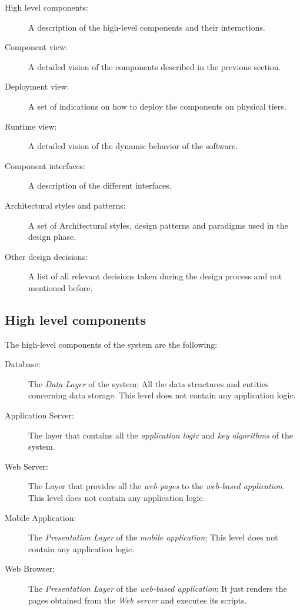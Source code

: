 \documentclass{article}
\begin{document}
	\bigskip
	\begin{description}
	\item [High level components:] A description of the high-level components and their interactions.
	\item [Component view:] A detailed vision of the components described in the previous section.
	\item [Deployment view:] A set of indications on how to deploy the components on physical tiers.
	\item [Runtime view:] A detailed vision of the dynamic behavior of the software.
	\item [Component interfaces:] A description of the different interfaces.
	\item [Architectural styles and patterns:] A set of Architectural styles, design patterns and paradigms used in the design phase.
	\item [Other design decisions:] A list of all relevant decisions taken during the design process and not mentioned before.
	\end{description}


	\subsection{High level components}

	The high-level components of the system are the following:

	\begin{description}
	\item [Database:] The \textit{Data Layer} of the system; All the data structures and entities concerning data storage. This level does not contain any application logic.
	\item [Application Server:] The layer that contains all the \textit{application logic} and \textit{key algorithms} of the system.
	\item [Web Server:] The Layer that provides all the \textit{web pages} to the \textit{web-based application}. This level does not contain any application logic.
	\item [Mobile Application:] The \textit{Presentation Layer} of the \textit{mobile application}; This level does not contain any application logic.
	\item [Web Browser:] The \textit{Presentation Layer} of the \textit{web-based application}; It just renders the pages obtained from the \textit{Web server} and executes its scripts.
	\end{description}
\end{document}
